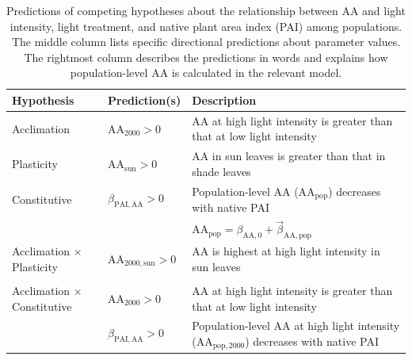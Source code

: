 \documentclass[
  letterpaper,
  DIV=11,
  numbers=noendperiod]{scrartcl}
\newcommand{\aax}{$\mathrm{AA}$}
\begin{document}
\begin{longtable}{>{\raggedright\arraybackslash}p{1in}>{\raggedright\arraybackslash}p{1.5in}>{\raggedright\arraybackslash}p{3in}}

\caption{\label{tbl-predictions}Predictions of competing hypotheses
about the relationship between \aax{} and light intensity, light
treatment, and native plant area index (PAI) among populations. The
middle column lists specific directional predictions about parameter
values. The rightmost column describes the predictions in words and
explains how population-level \aax{} is calculated in the relevant
model.}

\tabularnewline

\toprule
\textbf{Hypothesis} & \textbf{Prediction(s)} & \textbf{Description}\\
\midrule
Acclimation & $\mathrm{AA}_{2000} > 0$ & \hspace{-1em}\aax{} at high light intensity is greater than that at low light intensity\\
\cmidrule{1-3}\pagebreak[0]
Plasticity & $\mathrm{AA}_{\text{sun}} > 0$ & \hspace{-1em}\aax{} in sun leaves is greater than that in shade leaves\\
\cmidrule{1-3}\pagebreak[0]
Constitutive & $\beta_{\mathrm{PAI,AA}} > 0$ & \hspace{-1em}Population-level \aax{} ($\mathrm{AA}_\text{pop}$) decreases with native PAI\\
\nopagebreak
 &  & \hspace{-1em}$\mathrm{AA}_\text{pop} = \beta_{\mathrm{AA}, 0} + \vec{\beta}_{\mathrm{AA}, \text{pop}}$\\
\cmidrule{1-3}\pagebreak[0]
Acclimation $\times$ Plasticity & $\mathrm{AA}_{2000,\text{sun}} > 0$ & \hspace{-1em}\aax{} is highest at high light intensity in sun leaves\\
\nopagebreak
 &  & \hspace{-1em}\\
\cmidrule{1-3}\pagebreak[0]
Acclimation $\times$ Constitutive & $\mathrm{AA}_{2000} > 0$ & \hspace{-1em}\aax{} at high light intensity is greater than that at low light intensity\\
\nopagebreak
 & $\beta_{\mathrm{PAI,AA}} > 0$ & \hspace{-1em}Population-level \aax{} at high light intensity ($\mathrm{AA}_{\text{pop},2000}$) decreases with native PAI\\

\end{longtable}
\end{document}
